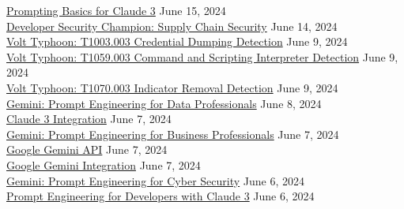 \documentclass[10pt]{res} %
\begin{document}
\begin{resume}
\href{https://bjdelacruz.dev/files/certificates/pluralsight/Prompting_Basics_for_Claude_3.pdf}{\color{blue}Prompting Basics for Claude 3} \hfill June 15, 2024 \\
\href{https://bjdelacruz.dev/files/certificates/pluralsight/Developer_Security_Champion_-_Supply_Chain_Security.pdf}{\color{blue}Developer Security Champion: Supply Chain Security} \hfill June 14, 2024 \\
\href{https://bjdelacruz.dev/files/certificates/pluralsight/Volt_Typhoon_-_T1003-003_Credential_Dumping_Detection.pdf}{\color{blue}Volt Typhoon: T1003.003 Credential Dumping Detection} \hfill June 9, 2024 \\
\href{https://bjdelacruz.dev/files/certificates/pluralsight/Volt_Typhoon_-_T1059-003_Command_and_Scripting_Interpreter_Detection.pdf}{\color{blue}Volt Typhoon: T1059.003 Command and Scripting Interpreter Detection} \hfill June 9, 2024 \\
\href{https://bjdelacruz.dev/files/certificates/pluralsight/Volt_Typhoon_-_T1070-003_Indicator_Removal_Detection.pdf}{\color{blue}Volt Typhoon: T1070.003 Indicator Removal Detection} \hfill June 9, 2024 \\
\href{https://bjdelacruz.dev/files/certificates/pluralsight/Gemini_-_Prompt_Engineering_for_Data_Professionals.pdf}{\color{blue}Gemini: Prompt Engineering for Data Professionals} \hfill June 8, 2024 \\
\href{https://bjdelacruz.dev/files/certificates/pluralsight/Claude_3_Integration.pdf}{\color{blue}Claude 3 Integration} \hfill June 7, 2024 \\
\href{https://bjdelacruz.dev/files/certificates/pluralsight/Gemini_-_Prompt_Engineering_for_Business_Professionals.pdf}{\color{blue}Gemini: Prompt Engineering for Business Professionals} \hfill June 7, 2024 \\
\href{https://bjdelacruz.dev/files/certificates/pluralsight/Google_Gemini_API.pdf}{\color{blue}Google Gemini API} \hfill June 7, 2024 \\
\href{https://bjdelacruz.dev/files/certificates/pluralsight/Google_Gemini_Integration.pdf}{\color{blue}Google Gemini Integration} \hfill June 7, 2024 \\
\href{https://bjdelacruz.dev/files/certificates/pluralsight/Gemini_-_Prompt_Engineering_for_Cyber_Security.pdf}{\color{blue}Gemini: Prompt Engineering for Cyber Security} \hfill June 6, 2024 \\
\href{https://bjdelacruz.dev/files/certificates/pluralsight/Prompt_Engineering_for_Developers_with_Claude_3.pdf}{\color{blue}Prompt Engineering for Developers with Claude 3} \hfill June 6, 2024 \\

\end{resume}
\end{document}
